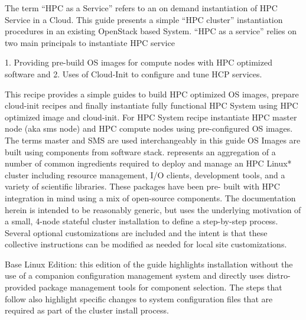 The term “HPC as a Service” refers to an on demand instantiation of HPC Service 
in a Cloud. This guide presents a simple “HPC cluster” instantiation procedures  
in an existing OpenStack based System. 
“HPC as a service” relies on two main principals to instantiate HPC service 

1. Providing pre-build OS images for compute nodes with HPC optimized software 
and 2. Uses of Cloud-Init to configure and tune HCP services. 

This recipe provides a simple guides to build HPC optimized OS images, prepare 
cloud-init recipes and finally instantiate fully functional HPC System using 
HPC optimized image and cloud-init. For HPC System recipe instantiate HPC 
master node (aka sms node) and HPC compute nodes using pre-configured OS images.
 The terms master and SMS are used interchangeably in this guide OS Images are 
 built using components from \OHPC{} software stack. \OHPC{} represents an 
 aggregation of a number of common ingredients required to deploy and manage an 
 HPC Linux* cluster including resource management, I/O clients, development 
 tools, and a variety of scientific libraries. These packages have been pre-
 built with HPC integration in mind using a mix of open-source components. The 
 documentation herein is intended to be reasonably generic, but uses the 
 underlying motivation of a small, 4-node stateful cluster installation to 
 define a step-by-step process. Several optional customizations are included 
 and the intent is that these collective instructions can be modified as needed
 for local site customizations.
 
Base Linux Edition: this edition of the guide highlights installation without 
the use of a companion configuration management system and directly uses distro-
provided package management tools for component selection. The steps that follow 
also highlight specific changes to system configuration files that are required 
as part of the cluster install process.

